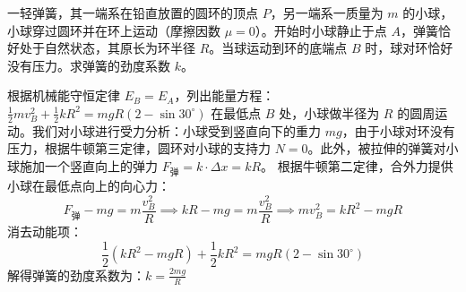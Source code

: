\begin{example}
一轻弹簧，其一端系在铅直放置的圆环的顶点 $P$，另一端系一质量为 $m$ 的小球，小球穿过圆环并在环上运动（摩擦因数 $\mu=0$）。开始时小球静止于点 $A$，弹簧恰好处于自然状态，其原长为环半径 $R$。当球运动到环的底端点 $B$ 时，球对环恰好没有压力。求弹簧的劲度系数 $k$。
\end{example}
\begin{solution}
根据机械能守恒定律 $E_B = E_A$，列出能量方程：
 \(\frac{1}{2}mv_B^2 + \frac{1}{2}kR^2 = mgR(2 - \sin 30^\circ)\) 
在最低点 $B$ 处，小球做半径为 $R$ 的圆周运动。我们对小球进行受力分析：小球受到竖直向下的重力 $mg$，由于小球对环没有压力，根据牛顿第三定律，圆环对小球的支持力 $N = 0$。此外，被拉伸的弹簧对小球施加一个竖直向上的弹力 $F_{\text{弹}} = k \cdot \Delta x = kR$。
根据牛顿第二定律，合外力提供小球在最低点向上的向心力：
\[
F_{\text{弹}} - mg = m\frac{v_B^2}{R} \implies kR - mg = m\frac{v_B^2}{R}\implies mv_B^2 = kR^2 - mgR
\]消去动能项：
\[
\frac{1}{2}(kR^2 - mgR) + \frac{1}{2}kR^2 = mgR(2 - \sin 30^\circ)
\]
解得弹簧的劲度系数为：$k = \frac{2mg}{R}$
\end{solution}
